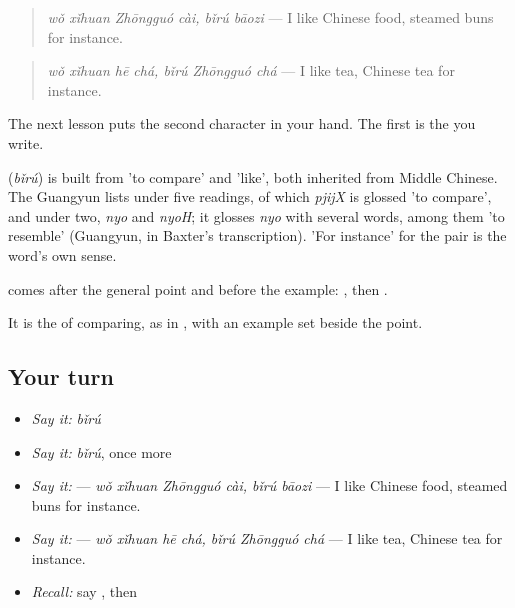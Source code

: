 \begin{quote}
\textbf{ } \emph{wǒ xǐhuan Zhōngguó cài, bǐrú bāozi} — I like Chinese food, steamed buns for instance.
\end{quote}

\begin{quote}
\textbf{ } \emph{wǒ xǐhuan hē chá, bǐrú Zhōngguó chá} — I like tea, Chinese tea for instance.
\end{quote}

The next lesson puts the second character in your hand. The first is the  you write.

\begin{cousinweb}
\textbf{} (\emph{bǐrú}) is built from  'to compare' and  'like', both inherited from Middle Chinese. The Guangyun lists  under five readings, of which \emph{pjijX} is glossed 'to compare', and  under two, \emph{nyo} and \emph{nyoH}; it glosses \emph{nyo} with several words, among them 'to resemble' (Guangyun, in Baxter's transcription). 'For instance' for the pair is the word's own sense.
\end{cousinweb}

\begin{grammarlens}[title={What you've built}]
 comes after the general point and before the example: , then .

It is the  of comparing,  as in , with an example set beside the point.
\end{grammarlens}

\subsection*{Your turn}
\begin{itemize}
\raggedright
  \item \emph{Say it:} \emph{bǐrú}
  \item \emph{Say it:} \emph{bǐrú}, once more
  \item \emph{Say it:}   — \emph{wǒ xǐhuan Zhōngguó cài, bǐrú bāozi} — I like Chinese food, steamed buns for instance.
  \item \emph{Say it:}   — \emph{wǒ xǐhuan hē chá, bǐrú Zhōngguó chá} — I like tea, Chinese tea for instance.
  \item \emph{Recall:} say , then 
\end{itemize}

